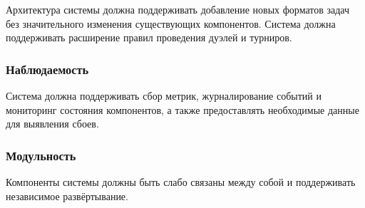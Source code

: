 Архитектура системы должна поддерживать добавление новых форматов задач без значительного изменения существующих компонентов.
Система должна поддерживать расширение правил проведения дуэлей и турниров.

\subsubsection*{Наблюдаемость}

Система должна поддерживать сбор метрик, журналирование событий и мониторинг состояния компонентов,
а также предоставлять необходимые данные для выявления сбоев.

\subsubsection*{Модульность}

Компоненты системы должны быть слабо связаны между собой и поддерживать независимое развёртывание.
